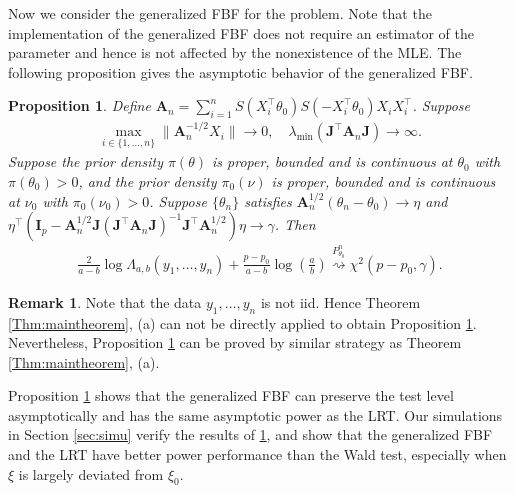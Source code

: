 \documentclass[11pt]{article}
\newcommand{\BA}{\mathbf{A}}    \newcommand{\BB}{\mathbf{B}}    \newcommand{\BC}{\mathbf{C}}    \newcommand{\BD}{\mathbf{D}}    \newcommand{\BE}{\mathbf{E}}    \newcommand{\BF}{\mathbf{F}}    \newcommand{\BG}{\mathbf{G}}    \newcommand{\BH}{\mathbf{H}}    \newcommand{\BI}{\mathbf{I}}    \newcommand{\BJ}{\mathbf{J}}    \newcommand{\BK}{\mathbf{K}}    \newcommand{\BL}{\mathbf{L}}
\newcommand{\myT}{\intercal}
\theoremstyle{plain}
\newtheorem{proposition}{\quad\quad Proposition}
\theoremstyle{definition}
\newtheorem{remark}{\quad\quad Remark}
\theoremstyle{remark}
\begin{document}
Now we consider the generalized FBF for the problem.
Note that the implementation of the generalized FBF does not require an estimator of the parameter and hence is not affected by the nonexistence of the MLE.
The following proposition gives the asymptotic behavior of the generalized FBF.
\begin{proposition}
    \label{prop:logistic}
    Define $
 \BA_n = 
    \sum_{i=1}^n 
    S( X_i^\myT \theta_0)
    S(- X_i^\myT \theta_0)
    X_i
    X_i^\myT $.
    Suppose
    \begin{align*}
     \max_{i\in \{1,\dots,n\}}
 \|\BA_n^{-1/2}
 X_i\| \to 0
 ,\quad
 \lambda_{\min}(\BJ^\myT \BA_n \BJ) \to \infty.
    \end{align*}
    Suppose the prior density $\pi(\theta)$ is proper, bounded and is continuous at $\theta_0$ with $\pi(\theta_0)> 0$, and the prior density $\pi_0(\nu)$ is proper, bounded and is continuous at $\nu_0$ with $\pi_0(\nu_0)> 0$.
Suppose $\{\theta_n\}$ satisfies $\BA_n^{1/2} (\theta_n - \theta_0) \to \eta$ and $
    \eta^\myT 
    (
        \BI_p-
    \BA_n^{1/2} \BJ ( \BJ^\myT \BA_n \BJ )^{-1} \BJ^\myT \BA_n^{1/2}  
)
\eta
\to \gamma
$.
Then
\begin{align*}
    \frac{2}{a-b}\log \Lambda_{a, b} (y_1, \dots, y_n)
    +
    \frac{p-p_0}{a-b} \log \left(\frac{a}{b}\right)
    \overset{P_{\theta_0}^n}{\rightsquigarrow}
    \chi^2 (p-p_0, \gamma)
.
\end{align*}
\end{proposition}
\begin{remark}
    Note that the data $y_1, \dots, y_n$ is not iid.
    Hence Theorem \ref{Thm:maintheorem}, (a) can not be directly applied to obtain Proposition \ref{prop:logistic}.
    Nevertheless, Proposition \ref{prop:logistic} can be proved by similar strategy as Theorem \ref{Thm:maintheorem}, (a).
\end{remark}
Proposition \ref{prop:logistic} shows that the generalized FBF can preserve the test level asymptotically and has the same asymptotic power as the LRT.
Our simulations in Section \ref{sec:simu} verify the results of \ref{prop:logistic},
and show that the generalized FBF and the LRT have better power performance than the Wald test, especially when $\xi$ is largely deviated from $\xi_0$.
\end{document}
